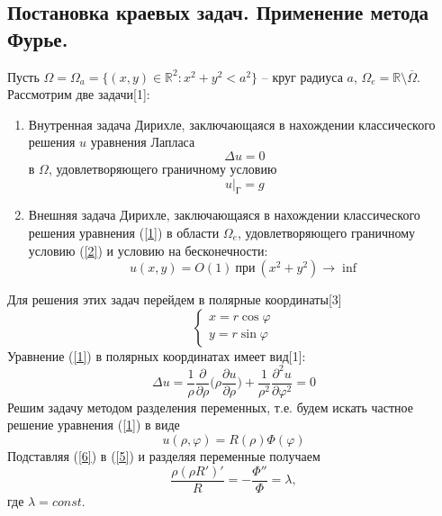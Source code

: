 \documentclass[14pt, a4paper]{extarticle}
\let\oldref\ref
\renewcommand{\ref}[1]{(\oldref{#1})}
\begin{document}
		\subsection{Постановка краевых задач. Применение метода Фурье.}
		Пусть $\Omega = \Omega_a = \{ (x, y) \in \mathbb{R}^2 : x^2 + y^2 < a^2 \}$ -- круг радиуса $a$, $\Omega_e = \mathbb{R} \setminus \overline{\Omega}$.
		Рассмотрим две задачи[1]:
		\begin{enumerate}
			\item Внутренная задача Дирихле, заключающаяся в нахождении классического решения $u$ уравнения Лапласа
				     \begin{equation} \label{1} \Delta u = 0 \end{equation}  
				     в $\Omega$, удовлетворяющего граничному условию
					 \begin{equation} u\big|_{\text{Г}} = g  \label{2}  \end{equation}
			\item Внешняя задача Дирихле, заключающаяся в нахождении классического решения уравнения  \ref{1}  в области $\Omega_e$, удовлетворяющего граничному условию \ref{2} и условию на бесконечности:
				\begin{equation}
					u(x, y) = O(1)\: \text{при} \: (x^2+y^2)  \rightarrow \inf
				\end{equation}
				
		\end{enumerate}
		Для решения этих задач перейдем в полярные координаты[3]
		\begin{equation}
			\begin{cases}
				x = r\cos{\varphi}\\
				y = r\sin{\varphi}
			\end{cases}
		\end{equation}
		Уравнение \ref{1} в полярных координатах имеет вид[1]:
		\begin{equation}
			\Delta u = \dfrac{1}{\rho} \dfrac{\partial}{\partial \rho} \bigg( \rho \dfrac{\partial u}{\partial \rho} \bigg) + \dfrac{1}{\rho^2} \dfrac{\partial^2 u}{\partial \varphi^2} = 0 \label{5}
		\end{equation}
		Решим задачу методом разделения переменных, т.е. будем искать частное решение уравнения \ref{1} в виде
		\begin{equation}
			u(\rho, \varphi) = R(\rho)\Phi(\varphi)	\label{6}
		\end{equation}
		Подставляя \ref{6} в \ref{5} и разделяя переменные получаем
		\begin{equation}
			\dfrac{\rho(\rho R')'}{R} = - \dfrac{\Phi''}{\Phi} = \lambda,
		\end{equation}
		где $\lambda = const$. 
		
\end{document}
